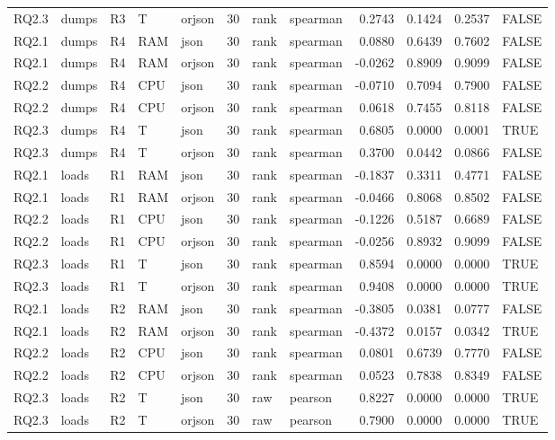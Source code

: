 \begin{table}[ht]
\begin{tabular}{lllllrllrrrl}
  RQ2.3 & dumps & R3 & T & orjson &    30 & rank & spearman & 0.2743 & 0.1424 & 0.2537 & FALSE \\ 
  RQ2.1 & dumps & R4 & RAM & json &    30 & rank & spearman & 0.0880 & 0.6439 & 0.7602 & FALSE \\ 
  RQ2.1 & dumps & R4 & RAM & orjson &    30 & rank & spearman & -0.0262 & 0.8909 & 0.9099 & FALSE \\ 
  RQ2.2 & dumps & R4 & CPU & json &    30 & rank & spearman & -0.0710 & 0.7094 & 0.7900 & FALSE \\ 
  RQ2.2 & dumps & R4 & CPU & orjson &    30 & rank & spearman & 0.0618 & 0.7455 & 0.8118 & FALSE \\ 
  RQ2.3 & dumps & R4 & T & json &    30 & rank & spearman & 0.6805 & 0.0000 & 0.0001 & TRUE \\ 
  RQ2.3 & dumps & R4 & T & orjson &    30 & rank & spearman & 0.3700 & 0.0442 & 0.0866 & FALSE \\ 
  RQ2.1 & loads & R1 & RAM & json &    30 & rank & spearman & -0.1837 & 0.3311 & 0.4771 & FALSE \\ 
  RQ2.1 & loads & R1 & RAM & orjson &    30 & rank & spearman & -0.0466 & 0.8068 & 0.8502 & FALSE \\ 
  RQ2.2 & loads & R1 & CPU & json &    30 & rank & spearman & -0.1226 & 0.5187 & 0.6689 & FALSE \\ 
  RQ2.2 & loads & R1 & CPU & orjson &    30 & rank & spearman & -0.0256 & 0.8932 & 0.9099 & FALSE \\ 
  RQ2.3 & loads & R1 & T & json &    30 & rank & spearman & 0.8594 & 0.0000 & 0.0000 & TRUE \\ 
  RQ2.3 & loads & R1 & T & orjson &    30 & rank & spearman & 0.9408 & 0.0000 & 0.0000 & TRUE \\ 
  RQ2.1 & loads & R2 & RAM & json &    30 & rank & spearman & -0.3805 & 0.0381 & 0.0777 & FALSE \\ 
  RQ2.1 & loads & R2 & RAM & orjson &    30 & rank & spearman & -0.4372 & 0.0157 & 0.0342 & TRUE \\ 
  RQ2.2 & loads & R2 & CPU & json &    30 & rank & spearman & 0.0801 & 0.6739 & 0.7770 & FALSE \\ 
  RQ2.2 & loads & R2 & CPU & orjson &    30 & rank & spearman & 0.0523 & 0.7838 & 0.8349 & FALSE \\ 
  RQ2.3 & loads & R2 & T & json &    30 & raw & pearson & 0.8227 & 0.0000 & 0.0000 & TRUE \\ 
  RQ2.3 & loads & R2 & T & orjson &    30 & raw & pearson & 0.7900 & 0.0000 & 0.0000 & TRUE \\ 

\end{tabular}
\end{table}
